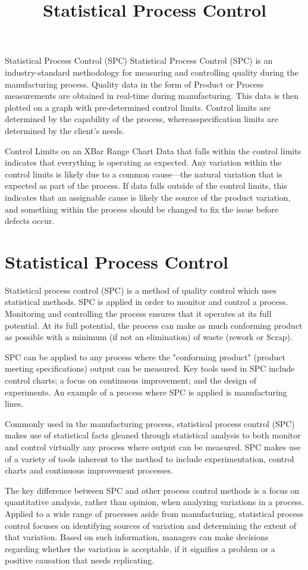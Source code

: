 \documentclass[12pt]{article}
\title{Statistical Process Control}
\begin{document}
Statistical Process Control (SPC)  
Statistical Process Control (SPC) is an industry-standard methodology for measuring and controlling quality during the manufacturing process. Quality data in the form of Product or Process measurements are obtained in real-time during manufacturing. 
This data is then plotted on a graph with pre-determined control limits. Control limits are determined by the capability of the process, whereasspecification limits are determined by the client's needs.

Control Limits on an XBar Range Chart
Data that falls within the control limits indicates that everything is operating as expected. Any variation within the control limits is likely due to a common cause—the natural variation that is expected as part of the process. 
If data falls outside of the control limits, this indicates that an assignable cause is likely the source of the product variation, and something within the process should be changed to fix the issue before defects occur.


\section*{Statistical Process Control}
	
	Statistical process control (SPC) is a method of quality control which uses statistical methods. SPC is applied in order to monitor and control a process. Monitoring and controlling the process ensures that it operates at its full potential. At its full potential, the process can make as much conforming product as possible with a minimum (if not an elimination) of waste (rework or Scrap).
	
	SPC can be applied to any process where the "conforming product" (product meeting specifications) output can be measured. Key tools used in SPC include control charts; a focus on continuous improvement; and the design of experiments. An example of a process where SPC is applied is manufacturing lines.
	

	
	Commonly used in the manufacturing process, statistical process control (SPC) makes use of statistical facts gleaned through statistical analysis to both monitor and control virtually any process where output can be measured. SPC makes use of a variety of tools inherent to the method to include experimentation, control charts and continuous improvement processes.
	
	The key difference between SPC and other process control methods is a focus on quantitative analysis, rather than opinion, when analyzing variations in a process. Applied to a wide range of processes aside from manufacturing, statistical process control focuses on identifying sources of variation and determining the extent of that variation. Based on such information, managers can make decisions regarding whether the variation is acceptable, if it signifies a problem or a positive causation that needs replicating.
\end{document}
